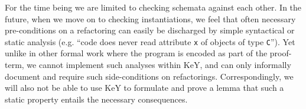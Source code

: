 For the time being we are limited to checking schemata against each other.
In the future, when we move on to checking instantiations, 
we feel that often necessary pre-conditions on a refactoring can easily be discharged by simple syntactical or static analysis (e.g. ``code does never read attribute \lstinline|x| of objects of type \lstinline|C|'').
Yet unlike in other formal work where the program is encoded as part of the proof-term, we cannot implement such analyses within KeY, and can only informally document and require such side-conditions on refactorings.
Correspondingly, we will also not be able to use KeY to formulate and prove a lemma that such a static property entails the necessary consequences.


